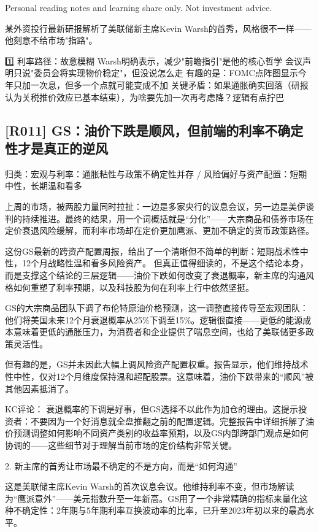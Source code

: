 \documentclass[11pt]{ctexart}
\begin{document}
Personal reading notes and learning share only. Not investment advice.

某外资投行最新研报解析了美联储新主席Kevin Warsh的首秀，风格很不一样——他刻意不给市场"指路"。

1️⃣ 利率路径：故意模糊 Warsh明确表示，减少"前瞻指引"是他的核心哲学 会议声明只说"委员会将实现物价稳定"，但没说怎么走 有趣的是：FOMC点阵图显示今年只加一次息，但多一个点就可能变成不加 关键矛盾：如果通胀确实回落（研报认为关税推价效应已基本结束），为啥要先加一次再考虑降？逻辑有点拧巴

\subsection{[R011] GS：油价下跌是顺风，但前端的利率不确定性才是真正的逆风}
{\small\color{refgray}归类：宏观与利率：通胀粘性与政策不确定性并存 / 风险偏好与资产配置：短期中性，长期温和看多}

上周的市场，被两股力量同时拉扯：一边是多家央行的议息会议，另一边是美伊谈判的持续推进。最终的结果，用一个词概括就是“分化”——大宗商品和债券市场在定价衰退风险缓解，而利率市场却在定价更加鹰派、更加不确定的货币政策路径。

这份GS最新的跨资产配置周报，给出了一个清晰但不简单的判断：短期战术性中性，12个月战略性温和看多风险资产。 但真正值得细读的，不是这个结论本身，而是支撑这个结论的三层逻辑——油价下跌如何改变了衰退概率，新主席的沟通风格如何重塑了利率预期，以及科技股为何在利率上行中依然坚挺。

GS的大宗商品团队下调了布伦特原油价格预测，这一调整直接传导至宏观团队：他们将美国未来12个月衰退概率从25\%下调至15\%。逻辑很直接——更低的能源成本意味着更低的通胀压力，为消费者和企业提供了喘息空间，也给了美联储更多政策灵活性。

但有趣的是，GS并未因此大幅上调风险资产配置权重。报告显示，他们维持战术性中性，仅对12个月维度保持温和超配股票。这意味着，油价下跌带来的“顺风”被其他因素抵消了。

KC评论： 衰退概率的下调是好事，但GS选择不以此作为加仓的理由。这提示投资者：不要因为一个好消息就全盘推翻之前的配置逻辑。完整报告中详细拆解了油价预测调整如何影响不同资产类别的收益率预期，以及GS内部跨部门观点是如何协调的——这些细节对于理解当前市场的定价结构非常关键。

2. 新主席的首秀让市场最不确定的不是方向，而是“如何沟通”

这是美联储主席Kevin Warsh的首次议息会议。他维持利率不变，但市场解读为“鹰派意外”——美元指数升至一年新高。GS用了一个非常精确的指标来量化这种不确定性：2年期与5年期利率互换波动率的比率，已升至2023年初以来的最高水平。
\end{document}
